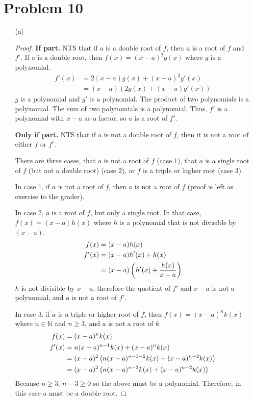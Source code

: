 \documentclass{article}
\newcommand*{\paren}[1]{\ensuremath\left(#1\right)}
\newcommand*{\problem}[1]{\section*{Problem #1}}
\begin{document}
\problem{10}
\begin{itemize}
	\item[(a)]
	\begin{proof}
		\textbf{If part.} NTS that if $a$ is a double root of $f$, then $a$ is a root of $f$ and $f'$. If $a$ is a double root, then $f(x)=(x-a)^2g(x)$ where $g$ is a polynomial.
		\begin{align*}
			f'(x)&=2(x-a)g(x)+(x-a)^2g'(x) \\
			&=(x-a)(2g(x)+(x-a)g'(x))
		\end{align*}
		$g$ is a polynomial and $g'$ is a polynomial. The product of two polynomials is a polynomial. The sum of two polynomials is a polynomial. Thus, $f'$ is a polynomial with $x-a$ as a factor, so $a$ is a root of $f'$.

		\textbf{Only if part.} NTS that if $a$ is not a double root of $f$, then it is not a root of either $f$ or $f'$.

		There are three cases, that $a$ is not a root of $f$ (case 1), that $a$ is a single root of $f$ (but not a double root) (case 2), or $f$ is a triple or higher root (case 3).

		In case 1, if $a$ is not a root of $f$, then $a$ is not a root of $f$ (proof is left as exercise to the grader).

		In case 2, $a$ is a root of $f$, but only a single root. In that case, $f(x)=(x-a)h(x)$ where $h$ is a polynomial that is not divisible by $(x-a)$.
		\begin{align*}
			f(x)&=(x-a)h(x) \\
			f'(x)&=(x-a)h'(x)+h(x) \\
			&=(x-a)\paren{h'(x)+\frac{h(x)}{x-a}}
		\end{align*}
		$h$ is not divisible by $x-a$, therefore the quotient of $f'$ and $x-a$ is not a polynomial, and $a$ is not a root of $f'$.

		In case 3, if $a$ is a triple or higher root of $f$, then $f(x)=(x-a)^nk(x)$ where $n\in\mathbb{N}$ and $n\geq3$, and $a$ is not a root of $k$.
		\begin{align*}
			f(x)&=(x-a)^nk(x) \\
			f'(x)&=n(x-a)^{n-1}k(x)+(x-a)^nk(x) \\
			&=(x-a)^2\paren{n(x-a)^{n-1-2}k(x)+(x-a)^{n-2}k(x)} \\
			&=(x-a)^2\paren{n(x-a)^{n-3}k(x)+(x-a)^{n-2}k(x)}
		\end{align*}
		Because $n\geq3$, $n-3\geq0$ so the above must be a polynomial. Therefore, in this case $a$ must be a double root.


\end{proof}
\end{itemize}
\end{document}
